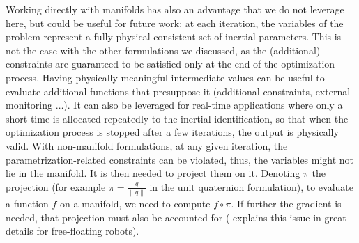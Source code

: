 
Working directly with manifolds has also an advantage that we do not leverage here, but could be useful for future work: at each iteration, the variables of the problem represent a fully physical consistent set of inertial parameters.
This is not the case with the other formulations we discussed, as the (additional) constraints are guaranteed to be satisfied only at the end of the optimization process. 
Having physically meaningful intermediate values can be useful to evaluate additional functions that presuppose it (additional constraints, external monitoring $\ldots$). 
It can also be leveraged for real-time applications where only a short time is allocated repeatedly to the inertial identification, so that when the optimization process is stopped after a few iterations, the output is physically valid.
With non-manifold formulations, at any given iteration, the parametrization-related constraints can be violated, thus, the variables might not lie in the manifold. It is then needed to project them on it. Denoting $\pi$ the projection (for example $\pi = \frac{q}{\left\|q\right\|}$ in the unit quaternion formulation), to evaluate a function $f$ on a manifold, we need to compute $f \circ \pi$. If further the gradient is needed, that projection must also be accounted for (\cite{bouyarmane2012humanoids} explains this issue in great details for free-floating robots).



